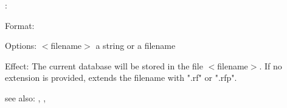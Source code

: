 \tell:

Format: 

Options: $<$filename$>$ a string or a filename

Effect: The current database  will be stored in the file
        $<$filename$>$. If no extension is provided, \RELFUN{} extends the
	filename with ".rf" or ".rfp".

see also: \consult, \destroy, \replace
